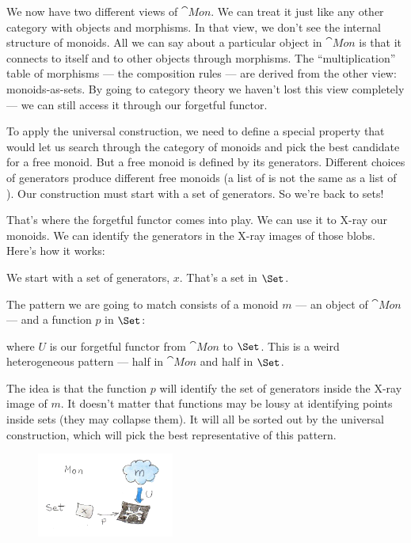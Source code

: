 We now have two different views of $\cat{Mon}$. We can treat it just
like any other category with objects and morphisms. In that view, we
don't see the internal structure of monoids. All we can say about a
particular object in $\cat{Mon}$ is that it connects to itself and to
other objects through morphisms. The ``multiplication'' table of
morphisms --- the composition rules --- are derived from the other view:
monoids-as-sets. By going to category theory we haven't lost this view
completely --- we can still access it through our forgetful functor.

To apply the universal construction, we need to define a special
property that would let us search through the category of monoids and
pick the best candidate for a free monoid. But a free monoid is defined
by its generators. Different choices of generators produce different
free monoids (a list of  is not the same as a list of
). Our construction must start with a set of generators. So
we're back to sets!

That's where the forgetful functor comes into play. We can use it to
X-ray our monoids. We can identify the generators in the X-ray images of
those blobs. Here's how it works:

We start with a set of generators, $x$. That's a set in
$\Set$.

The pattern we are going to match consists of a monoid $m$ --- an
object of $\cat{Mon}$ --- and a function $p$ in $\Set$:

where $U$ is our forgetful functor from $\cat{Mon}$ to
$\Set$. This is a weird heterogeneous pattern --- half in
$\cat{Mon}$ and half in $\Set$.

The idea is that the function $p$ will identify the set of
generators inside the X-ray image of $m$. It doesn't matter that
functions may be lousy at identifying points inside sets (they may
collapse them). It will all be sorted out by the universal construction,
which will pick the best representative of this pattern.

\begin{figure}[H]
\centering
\includegraphics[width=0.4\textwidth]{images/monoid-pattern.jpg}
\end{figure}

